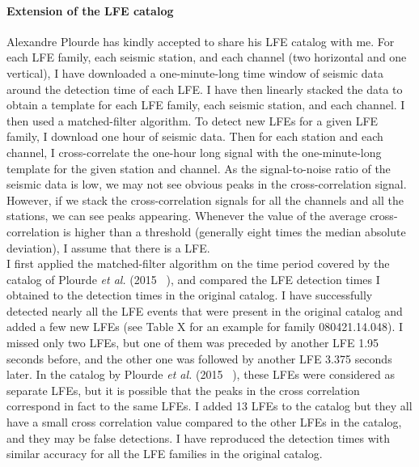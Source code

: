 \documentclass[letterpaper, 12pt]{article}
\begin{document}
\paragraph{Extension of the LFE catalog} Alexandre Plourde has kindly accepted to share his LFE catalog with me. For each LFE family, each seismic station, and each channel (two horizontal and one vertical), I have downloaded a one-minute-long time window of seismic data around the detection time of each LFE. I have then linearly stacked the data to obtain a template for each LFE family, each seismic station, and each channel. I then used a matched-filter algorithm. To detect new LFEs for a given LFE family, I download one hour of seismic data. Then for each station and each channel, I cross-correlate the one-hour long signal with the one-minute-long template for the given station and channel. As the signal-to-noise ratio of the seismic data is low, we may not see obvious peaks in the cross-correlation signal. However, if we stack the cross-correlation signals for all the channels and all the stations, we can see peaks appearing. Whenever the value of the average cross-correlation is higher than a threshold (generally eight times the median absolute deviation), I assume that there is a LFE. \\

I first applied the matched-filter algorithm on the time period covered by the catalog of Plourde \textit{et al.} (2015 ~\cite{PLO_2015}), and compared the LFE detection times I obtained to the detection times in the original catalog. I have successfully detected nearly all the LFE events that were present in the original catalog and added a few new LFEs (see Table X for an example for family 080421.14.048). I missed only two LFEs, but one of them was preceded by another LFE 1.95 seconds before, and the other one was followed by another LFE 3.375 seconds later. In the catalog by Plourde \textit{et al.} (2015 ~\cite{PLO_2015}), these LFEs were considered as separate LFEs, but it is possible that the peaks in the cross correlation correspond in fact to the same LFEs. I added 13 LFEs to the catalog but they all have a small cross correlation value compared to the other LFEs in the catalog, and they may be false detections. I have reproduced the detection times with similar accuracy for all the LFE families in the original catalog. \\
\end{document}

